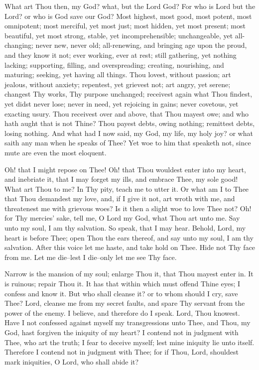 \documentclass[b5paper,openright,12pt,twoside]{book}
\begin{document}
What art Thou then, my God? what, but the Lord God? For who is Lord
but the Lord? or who is God save our God? Most highest, most good, most
potent, most omnipotent; most merciful, yet most just; most hidden,
yet most present; most beautiful, yet most strong, stable, yet
incomprehensible; unchangeable, yet all-changing; never new, never old;
all-renewing, and bringing age upon the proud, and they know it not;
ever working, ever at rest; still gathering, yet nothing lacking;
supporting, filling, and overspreading; creating, nourishing, and
maturing; seeking, yet having all things. Thou lovest, without passion;
art jealous, without anxiety; repentest, yet grievest not; art angry,
yet serene; changest Thy works, Thy purpose unchanged; receivest again
what Thou findest, yet didst never lose; never in need, yet rejoicing
in gains; never covetous, yet exacting usury. Thou receivest over and
above, that Thou mayest owe; and who hath aught that is not Thine? Thou
payest debts, owing nothing; remittest debts, losing nothing. And what
had I now said, my God, my life, my holy joy? or what saith any man when
he speaks of Thee? Yet woe to him that speaketh not, since mute are even
the most eloquent.

Oh! that I might repose on Thee! Oh! that Thou wouldest enter into my
heart, and inebriate it, that I may forget my ills, and embrace Thee,
my sole good! What art Thou to me? In Thy pity, teach me to utter it.
Or what am I to Thee that Thou demandest my love, and, if I give it not,
art wroth with me, and threatenest me with grievous woes? Is it then a
slight woe to love Thee not? Oh! for Thy mercies' sake, tell me, O Lord
my God, what Thou art unto me. Say unto my soul, I am thy salvation. So
speak, that I may hear. Behold, Lord, my heart is before Thee; open Thou
the ears thereof, and say unto my soul, I am thy salvation. After this
voice let me haste, and take hold on Thee. Hide not Thy face from me.
Let me die--lest I die--only let me see Thy face.

Narrow is the mansion of my soul; enlarge Thou it, that Thou mayest
enter in. It is ruinous; repair Thou it. It has that within which must
offend Thine eyes; I confess and know it. But who shall cleanse it? or
to whom should I cry, save Thee? Lord, cleanse me from my secret faults,
and spare Thy servant from the power of the enemy. I believe, and
therefore do I speak. Lord, Thou knowest. Have I not confessed against
myself my transgressions unto Thee, and Thou, my God, hast forgiven the
iniquity of my heart? I contend not in judgment with Thee, who art the
truth; I fear to deceive myself; lest mine iniquity lie unto itself.
Therefore I contend not in judgment with Thee; for if Thou, Lord,
shouldest mark iniquities, O Lord, who shall abide it?
\end{document}
